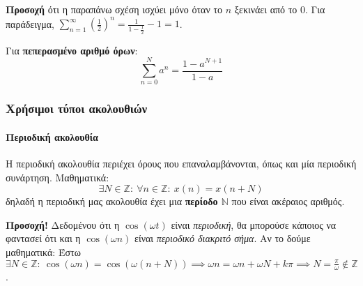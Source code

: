 \documentclass[11pt,a4paper,notitlepage,fleqn]{article}
\begin{document}
\textbf{Προσοχή} ότι η παραπάνω σχέση ισχύει μόνο όταν το \( n \) ξεκινάει από το 0. Για παράδειγμα,
\( \sum_{n=1}^\infty {\left(\frac{1}{2}\right)^n} = \frac{1}{1-\frac{1}{2}}-1 = 1 \).

Για \textbf{πεπερασμένο αριθμό όρων}:
\[
\sum_{n=0}^{N} a^n
= \frac{1-a^{N+1}}{1-a}
\]

\subsubsection{Χρήσιμοι τύποι ακολουθιών}
\paragraph{Περιοδική ακολουθία}
\label{sec:periodic}
Η περιοδική ακολουθία περιέχει όρους που επαναλαμβάνονται, όπως και μία περιοδική συνάρτηση.
Μαθηματικά:
\[
\exists N \in \mathbb Z: \ \forall n \in \mathbb Z: \ x(n) = x(n+N)
\]
δηλαδή η περιοδική μας ακολουθία έχει μια \textbf{περίοδο \( \mathbb N \)} που είναι ακέραιος αριθμός.

\textbf{Προσοχή!} Δεδομένου ότι η \( \cos(\omega t) \) είναι \textit{περιοδική}, θα μπορούσε κάποιος
να φαντασεί ότι και η \( \cos(\omega n) \) είναι \textit{περιοδικό διακριτό σήμα}. Αν το δούμε μαθηματικά:
Έστω \( \exists N \in \mathbb Z:\ \cos(\omega n)=\cos\left( \omega (n+N) \right)
\implies \omega n = \omega n + \omega N + kπ \implies N = \frac{π}{\omega } \notin \mathbb Z \).
\end{document}
